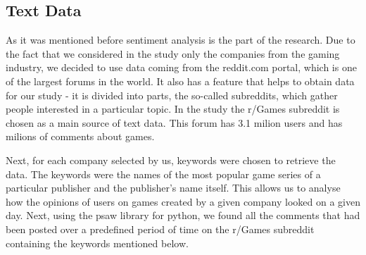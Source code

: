 \documentclass[11pt]{article} %
\begin{document}
\subsection{Text Data}
As it was mentioned before sentiment analysis is the part of the research. Due to the fact that we considered in the study only the companies from the gaming industry, we decided to use data coming from the reddit.com portal, which is one of the largest forums in the world. It also has a feature that helps to obtain data for our study - it is divided into parts, the so-called subreddits, which gather people interested in a particular topic. In the study the r/Games subreddit is chosen as a main source of text data. This forum has 3.1 milion users and has milions of comments about games. 

Next, for each company selected by us, keywords were chosen to retrieve the data. The keywords were the names of the most popular game series of a particular publisher and the publisher's name itself. This allows us to analyse how the opinions of users on games created by a given company looked on a given day. Next, using the psaw library for python, we found all the comments that had been posted over a predefined period of time on the r/Games subreddit containing the keywords mentioned below. 
\end{document}
